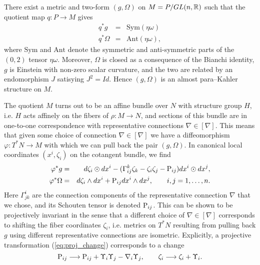 \begin{theo}{\cite{DM}}\label{thm:DM}
There exist a metric and two-form
$(g,\Omega)$ on $\mbox{\ensuremath{M=P/GL(n,\mathbb{R})}}$ such
that the quotient map $q:P\rightarrow M$ gives
\begin{eqnarray} 
q^{*}g & = & \mathrm{Sym}(\eta\omega) \label{eq:g_cartan} \\
q^{*}\Omega & = & \mathrm{Ant}(\eta\omega), \label{eq:Omega_cartan}
\end{eqnarray}
where $\mathrm{Sym}$ and $\mathrm{Ant}$ denote the symmetric and
anti-symmetric parts of the $(0,2)$ tensor $\eta\omega$. Moreover,
$\Omega$ is closed as a consequence of the Bianchi identity, $g$
is Einstein with non-zero scalar curvature, and the two are related
by an endomorphism $J$ satisying $J^{2}=Id$. Hence $(g,\Omega)$
is an almost para--Kahler structure on $M$.
\end{theo}

\begin{rmk}
The quotient $M$ turns out to be an affine bundle over $N$ with
structure group $H$, i.e. $H$ acts affinely on the fibers of $\rho:M\rightarrow N$,
and sections of this bundle are in one-to-one correspondence with
representative connections $\nabla\in[\nabla]$. This means that given
some choice of connection $\nabla\in[\nabla]$ we have a diffeomorphism
$\varphi:T^{*}N\rightarrow M$ with which we can pull back the pair
$(g,\Omega)$. In canonical local coordinates $(x^{i},\zeta_{i})$ on
the cotangent bundle, we find
\begin{eqnarray}
\varphi^{*}g & = &  d\zeta_{i}\odot dx^{i}-(\Gamma_{ij}^{k}\zeta_{k}-\zeta_{i}\zeta_{j}-\mathrm{P}_{ij}) dx^{i}\odot dx^{j},\label{eq:coord_form}\\
\varphi^{*}\Omega & = &  d\zeta_{i}\wedge dx^{i}+\mathrm{P}_{ij} dx^{i}\wedge dx^{j},\qquad i,j=1,\dots ,n.\nonumber 
\end{eqnarray}
Here $\Gamma_{jk}^{i}$ are the connection components of the representative
connection $\nabla$ that we chose, and its Schouten tensor is denoted $\mathrm{P}_{ij}$. This can be shown to be projectively invariant
in the sense that a different choice of $\nabla\in[\nabla]$ corresponds
to shifting the fiber coordinates $\zeta_{i}$, i.e. metrics on $T^{*}N$
resulting from pulling back $g$ using different representative connections
are isometric. Explicitly, a projective transformation (\ref{eq:proj_change})
corresponds to a change
\begin{equation}
\mathrm{P}_{ij}\longrightarrow \mathrm{P}_{ij}+\Upsilon_{i}\Upsilon_{j}-\nabla_{i}\Upsilon_{j},\qquad \zeta_{i}\longrightarrow \zeta_{i}+\Upsilon_{i}.\label{eq:zeta_change}
\end{equation}
\end{rmk}

